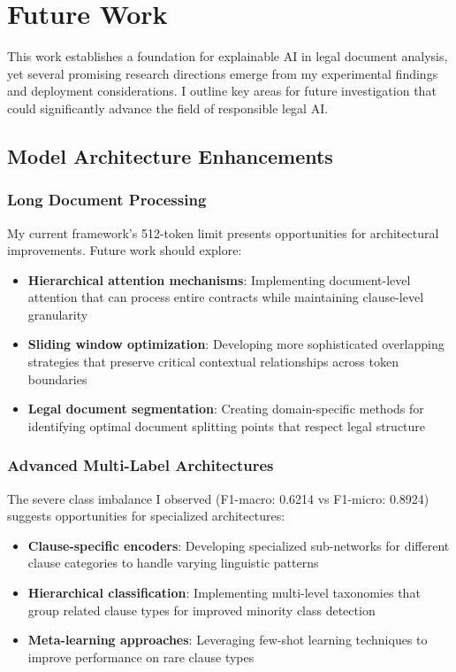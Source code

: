 \section{Future Work}
\label{sec:future_work}

This work establishes a foundation for explainable AI in legal document analysis, yet several promising research directions emerge from my experimental findings and deployment considerations. I outline key areas for future investigation that could significantly advance the field of responsible legal AI.

\subsection{Model Architecture Enhancements}
\label{subsec:model_enhancements}

\subsubsection{Long Document Processing}
My current framework's 512-token limit presents opportunities for architectural improvements. Future work should explore:

\begin{itemize}
\item \textbf{Hierarchical attention mechanisms}: Implementing document-level attention that can process entire contracts while maintaining clause-level granularity
\item \textbf{Sliding window optimization}: Developing more sophisticated overlapping strategies that preserve critical contextual relationships across token boundaries
\item \textbf{Legal document segmentation}: Creating domain-specific methods for identifying optimal document splitting points that respect legal structure
\end{itemize}

\subsubsection{Advanced Multi-Label Architectures}
The severe class imbalance I observed (F1-macro: 0.6214 vs F1-micro: 0.8924) suggests opportunities for specialized architectures:

\begin{itemize}
\item \textbf{Clause-specific encoders}: Developing specialized sub-networks for different clause categories to handle varying linguistic patterns
\item \textbf{Hierarchical classification}: Implementing multi-level taxonomies that group related clause types for improved minority class detection
\item \textbf{Meta-learning approaches}: Leveraging few-shot learning techniques to improve performance on rare clause types
\end{itemize}

